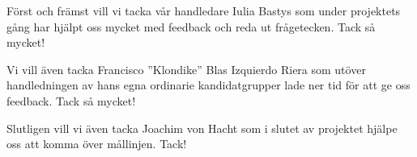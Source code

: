 Först och främst vill vi tacka vår handledare Iulia Bastys som under projektets gång har hjälpt oss mycket med feedback och reda ut frågetecken.
Tack så mycket!

Vi vill även tacka Francisco ''Klondike'' Blas Izquierdo Riera som utöver handledningen av hans egna ordinarie kandidatgrupper lade ner tid för att ge oss feedback.
Tack så mycket!

Slutligen vill vi även tacka Joachim von Hacht som i slutet av projektet hjälpe oss att komma över mållinjen.
Tack!
